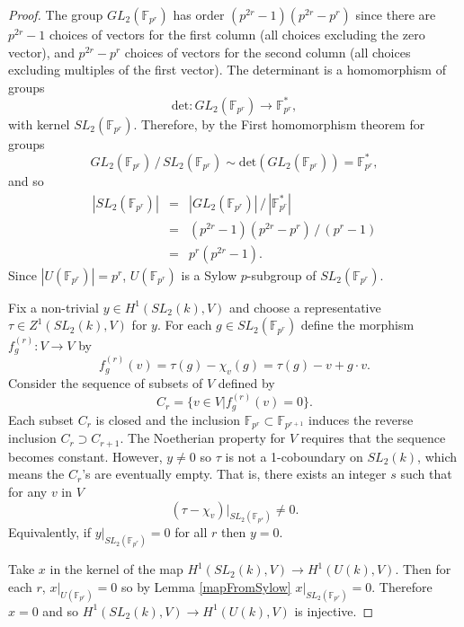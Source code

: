 \begin{proof}
	The group $GL_2(\mathbb{F}_{p^r})$ has order $(p^{2r} - 1)(p^{2r} - p^r)$ since there are $p^{2r} - 1$ choices of vectors for the first column (all choices excluding the zero vector), and $p^{2r} - p^r$ choices of vectors for the second column (all choices excluding multiples of the first vector). The determinant is a homomorphism of groups
	\begin{displaymath}
		\mathrm{det}:GL_2(\mathbb{F}_{p^r}) \rightarrow \mathbb{F}^*_{p^r},
	\end{displaymath}
	with kernel $SL_2(\mathbb{F}_{p^r})$. Therefore, by the First homomorphism theorem for groups
	\begin{displaymath}
		GL_2(\mathbb{F}_{p^r})\,/\,SL_2(\mathbb{F}_{p^r}) \sim \mathrm{det}(GL_2(\mathbb{F}_{p^r})) = \mathbb{F}^*_{p^r},
	\end{displaymath}
	and so
	\begin{eqnarray*}
		|SL_2(\mathbb{F}_{p^r})|
		&=& |GL_2(\mathbb{F}_{p^r})|\,/\,|\mathbb{F}^*_{p^r}|\\
		&=& (p^{2r} - 1)(p^{2r} - p^r)\,/\,(p^r - 1)\\
		&=& p^r(p^{2r} - 1).
	\end{eqnarray*}
	Since $|U(\mathbb{F}_{p^r})| = p^r$, $U(\mathbb{F}_{p^r})$ is a Sylow $p$-subgroup of $SL_2(\mathbb{F}_{p^r})$.
	
	Fix a non-trivial $y\in H^1(SL_2(k), V)$ and choose a representative $\tau\in Z^1(SL_2(k), V)$ for $y$. For each $g\in SL_2(\mathbb{F}_{p^r})$ define the morphism $f^{(r)}_g:V\rightarrow V$ by
	\begin{displaymath}
		f^{(r)}_g(v) = \tau(g) - \chi_v(g) = \tau(g) - v + g\cdot v.
	\end{displaymath}
	Consider the sequence of subsets of $V$ defined by
	\begin{displaymath}
		C_r = \{v \in V | f^{(r)}_g(v) = 0\}.
	\end{displaymath}
	Each subset $C_r$ is closed and the inclusion $\mathbb{F}_{p^r} \subset \mathbb{F}_{p^{r+1}}$ induces the reverse inclusion $C_r \supset C_{r+1}$. The Noetherian property for $V$ requires that the sequence becomes constant. However, $y\neq 0$ so $\tau$ is not a 1-coboundary on $SL_2(k)$, which means the $C_r$'s are eventually empty. That is, there exists an integer $s$ such that for any $v$ in $V$
	\begin{displaymath}
		(\tau - \chi_v)|_{SL_2(\mathbb{F}_{p^s})} \neq 0.
	\end{displaymath}
	Equivalently, if $y|_{SL_2(\mathbb{F}_{p^r})} = 0$ for all $r$ then $y = 0$.
	
	Take $x$ in the kernel of the map $H^1(SL_2(k), V) \rightarrow H^1(U(k), V)$. Then for each $r$, $x|_{U(\mathbb{F}_{p^r})} = 0$ so by Lemma \ref{mapFromSylow} $x|_{SL_2(\mathbb{F}_{p^r})} = 0$. Therefore $x=0$ and so $H^1(SL_2(k), V) \rightarrow H^1(U(k), V)$ is injective.
\end{proof}

